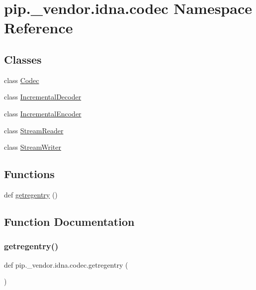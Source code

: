 \hypertarget{namespacepip_1_1__vendor_1_1idna_1_1codec}{}\section{pip.\+\_\+vendor.\+idna.\+codec Namespace Reference}
\label{namespacepip_1_1__vendor_1_1idna_1_1codec}
\subsection*{Classes}
\begin{DoxyCompactItemize}
\item 
class \hyperlink{classpip_1_1__vendor_1_1idna_1_1codec_1_1Codec}{Codec}
\item 
class \hyperlink{classpip_1_1__vendor_1_1idna_1_1codec_1_1IncrementalDecoder}{Incremental\+Decoder}
\item 
class \hyperlink{classpip_1_1__vendor_1_1idna_1_1codec_1_1IncrementalEncoder}{Incremental\+Encoder}
\item 
class \hyperlink{classpip_1_1__vendor_1_1idna_1_1codec_1_1StreamReader}{Stream\+Reader}
\item 
class \hyperlink{classpip_1_1__vendor_1_1idna_1_1codec_1_1StreamWriter}{Stream\+Writer}
\end{DoxyCompactItemize}
\subsection*{Functions}
\begin{DoxyCompactItemize}
\item 
def \hyperlink{namespacepip_1_1__vendor_1_1idna_1_1codec_a162de209baa940ea705bb272545380a5}{getregentry} ()
\end{DoxyCompactItemize}


\subsection{Function Documentation}
\mbox{\label{namespacepip_1_1__vendor_1_1idna_1_1codec_a162de209baa940ea705bb272545380a5}} 
\subsubsection{\texorpdfstring{getregentry()}{getregentry()}}
{\footnotesize\ttfamily def pip.\+\_\+vendor.\+idna.\+codec.\+getregentry (\begin{DoxyParamCaption}{ }\end{DoxyParamCaption})}

